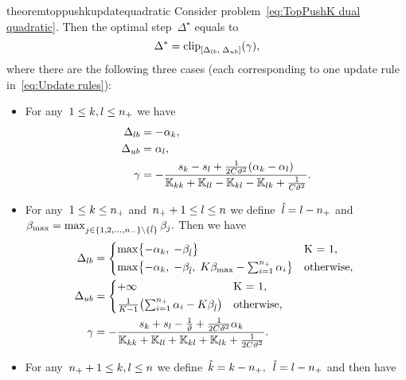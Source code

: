 \begin{restatable}{theorem}{toppushkupdatequadratic}\label{thm:Update rule TopPushK with quadratic loss}
  Consider problem~\eqref{eq:TopPushK dual quadratic}. Then the optimal step~$\Delta^\star$ equals to
  \begin{equation}\label{eq:Optimal delta}
    \Delta^{*} = \clip{\Delta_{lb}}{\Delta_{ub}}{\gamma},
  \end{equation}
  where there are the following three cases (each corresponding to one update rule in~\eqref{eq:Update rules}):
  \begin{itemize}
    \item For any~$1\le k, l \le n_{+}$ we have
    \begin{align*}
      \Delta_{lb} & = -\alpha_k, \\
      \Delta_{ub} & = \alpha_l, \\
      \gamma      & = -\frac{s_k - s_l + \frac{1}{2C\vartheta^2}(\alpha_k - \alpha_l)}{\mathbb{K}_{kk} + \mathbb{K}_{ll} - \mathbb{K}_{kl} - \mathbb{K}_{lk} + \frac{1}{C\vartheta^2}}.
    \end{align*}
    \item For any~$1 \le k \le n_{+}$ and~$n_{+} + 1 \le l \le n$ we define~$\hat{l} = l - n_{+}$  and~$\beta_{\max} = \max_{j \in \{1, 2, \ldots, n_{-} \} \setminus \{\hat l\}} \beta_j.$ Then we have
    \begin{align*}
      \Delta_{lb} & = 
        \begin{cases*}
          \max \Brac[c]{- \alpha_k,\;  -\beta_{\hat l}} & K = 1, \\
          \max \Brac[c]{- \alpha_k,\;  -\beta_{\hat l}, \; K\beta_{\max} - \sum_{i = 1}^{\npos} \alpha_i} & \textrm{otherwise},
        \end{cases*} \\
      \Delta_{ub} & = 
        \begin{cases*}
          + \infty & K = 1, \\
          \frac{1}{K-1}\Brac{\sum_{i = 1}^{\npos} \alpha_i - K \beta_{\hat l}} & \textrm{otherwise},
        \end{cases*} \\
      \gamma & = -\frac{s_k + s_l - \frac{1}{\vartheta} + \frac{1}{2C\vartheta^2} \alpha_k}{\K_{kk} + \K_{ll} + \K_{kl} + \K_{lk} + \frac{1}{2C\vartheta^2}}.
    \end{align*}
    \item For any~$n_{+} + 1\le k,l \le n$ we define~$\hat{k} = k - n_{+},$~$\hat{l} = l - n_{+}$ and then  have

\end{itemize}
\end{restatable}
